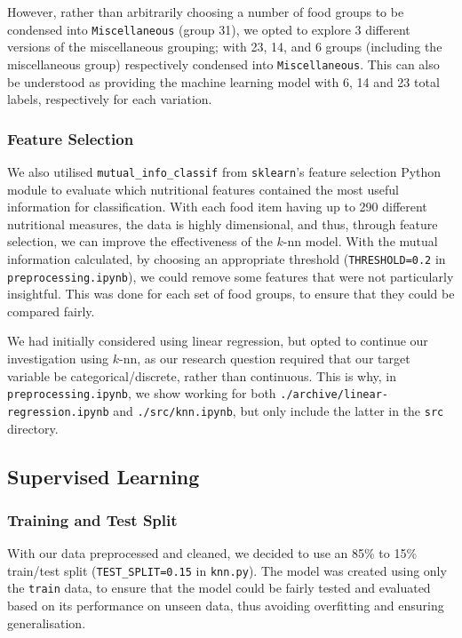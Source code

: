 \documentclass[11pt]{article}
\begin{document}
However, rather than arbitrarily choosing a number of food groups to be condensed into \verb|Miscellaneous| (group 31), we opted to explore 3 different versions of the miscellaneous grouping; with 23, 14, and 6 groups (including the miscellaneous group) respectively condensed into \verb|Miscellaneous|. This can also be understood as providing the machine learning model with 6, 14 and 23 total labels, respectively for each variation.

\subsubsection{Feature Selection}

We also utilised \verb|mutual_info_classif| from \verb|sklearn|'s feature selection Python module to evaluate which nutritional features contained the most useful information for classification. With each food item having up to 290 different nutritional measures, the data is highly dimensional, and thus, through feature selection, we can improve the effectiveness of the $k$-nn model. With the mutual information calculated, by choosing an appropriate threshold (\verb|THRESHOLD=0.2| in \verb|preprocessing.ipynb|), we could remove some features that were not particularly insightful. This was done for each set of food groups, to ensure that they could be compared fairly.

We had initially considered using linear regression, but opted to continue our investigation using $k$-nn, as our research question required that our target variable be categorical/discrete, rather than continuous.  This is why, in \verb|preprocessing.ipynb|, we show working for both \verb|./archive/linear-regression.ipynb| and \verb|./src/knn.ipynb|, but only include the latter in the \verb|src| directory.

\subsection{Supervised Learning}

\subsubsection{Training and Test Split}

With our data preprocessed and cleaned, we decided to use an 85\% to 15\% train/test split (\verb|TEST_SPLIT=0.15| in \verb|knn.py|). The model was created using only the \verb|train| data, to ensure that the model could be fairly tested and evaluated based on its performance on unseen data, thus avoiding overfitting and ensuring generalisation.
\end{document}
